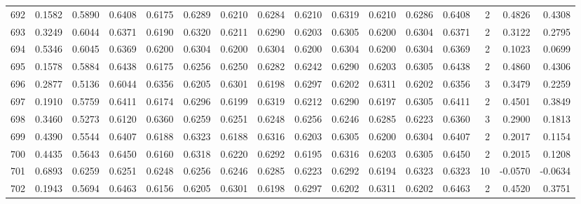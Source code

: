 \begin{tabular}{lrrrrrrrrrrrrrrr}
692 &      0.1582 &  0.5890 &  0.6408 &  0.6175 &  0.6289 &  0.6210 &  0.6284 &  0.6210 &  0.6319 &  0.6210 &   0.6286 &     0.6408 &      2 &                    0.4826 &                     0.4308 \\
693 &      0.3249 &  0.6044 &  0.6371 &  0.6190 &  0.6320 &  0.6211 &  0.6290 &  0.6203 &  0.6305 &  0.6200 &   0.6304 &     0.6371 &      2 &                    0.3122 &                     0.2795 \\
694 &      0.5346 &  0.6045 &  0.6369 &  0.6200 &  0.6304 &  0.6200 &  0.6304 &  0.6200 &  0.6304 &  0.6200 &   0.6304 &     0.6369 &      2 &                    0.1023 &                     0.0699 \\
695 &      0.1578 &  0.5884 &  0.6438 &  0.6175 &  0.6256 &  0.6250 &  0.6282 &  0.6242 &  0.6290 &  0.6203 &   0.6305 &     0.6438 &      2 &                    0.4860 &                     0.4306 \\
696 &      0.2877 &  0.5136 &  0.6044 &  0.6356 &  0.6205 &  0.6301 &  0.6198 &  0.6297 &  0.6202 &  0.6311 &   0.6202 &     0.6356 &      3 &                    0.3479 &                     0.2259 \\
697 &      0.1910 &  0.5759 &  0.6411 &  0.6174 &  0.6296 &  0.6199 &  0.6319 &  0.6212 &  0.6290 &  0.6197 &   0.6305 &     0.6411 &      2 &                    0.4501 &                     0.3849 \\
698 &      0.3460 &  0.5273 &  0.6120 &  0.6360 &  0.6259 &  0.6251 &  0.6248 &  0.6256 &  0.6246 &  0.6285 &   0.6223 &     0.6360 &      3 &                    0.2900 &                     0.1813 \\
699 &      0.4390 &  0.5544 &  0.6407 &  0.6188 &  0.6323 &  0.6188 &  0.6316 &  0.6203 &  0.6305 &  0.6200 &   0.6304 &     0.6407 &      2 &                    0.2017 &                     0.1154 \\
700 &      0.4435 &  0.5643 &  0.6450 &  0.6160 &  0.6318 &  0.6220 &  0.6292 &  0.6195 &  0.6316 &  0.6203 &   0.6305 &     0.6450 &      2 &                    0.2015 &                     0.1208 \\
701 &      0.6893 &  0.6259 &  0.6251 &  0.6248 &  0.6256 &  0.6246 &  0.6285 &  0.6223 &  0.6292 &  0.6194 &   0.6323 &     0.6323 &     10 &                   -0.0570 &                    -0.0634 \\
702 &      0.1943 &  0.5694 &  0.6463 &  0.6156 &  0.6205 &  0.6301 &  0.6198 &  0.6297 &  0.6202 &  0.6311 &   0.6202 &     0.6463 &      2 &                    0.4520 &                     0.3751 \\

\end{tabular}

